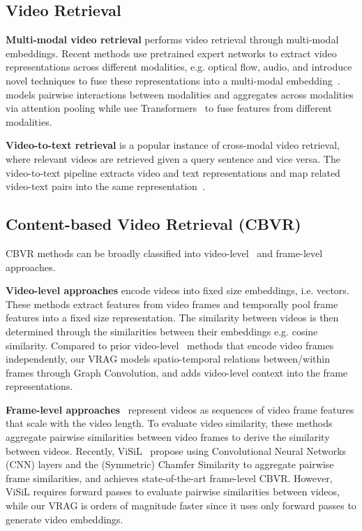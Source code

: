 \documentclass[letterpaper]{article} \usepackage{aaai22}  \usepackage{times}  \usepackage{helvet}  \usepackage{courier}  \usepackage[hyphens]{url}  \usepackage{graphicx} \urlstyle{rm} \usepackage{amsmath}
\begin{document}
\subsection{Video Retrieval}

\textbf{Multi-modal video retrieval} performs video retrieval through multi-modal embeddings. Recent methods use pretrained expert networks to extract video representations across different modalities, e.g. optical flow, audio, and introduce novel techniques to fuse these representations into a multi-modal embedding~\cite{collaborative-experts, moEE, mm-transformer}. \cite{collaborative-experts} models pairwise interactions between modalities and aggregates across modalities via attention pooling while \cite{mm-transformer} use Transformers~\cite{attention-is-all-you-need} to fuse features from different modalities.

\textbf{Video-to-text retrieval} is a popular instance of cross-modal video retrieval, where relevant videos are retrieved given a query sentence and vice versa. The video-to-text pipeline extracts video and text representations and map related video-text pairs into the same representation~\cite{collaborative-experts, howto100m}.

\subsection{Content-based Video Retrieval (CBVR)}
CBVR methods can be broadly classified into video-level~\cite{baseline:tmk, Baraldi2018LAMVLT, kordopatis2017dml, lbow} and frame-level~\cite{temporal_network, baseline:dp, kordopatiszilos2019visil} approaches.

\textbf{Video-level approaches} encode videos into fixed size embeddings, i.e.  vectors. These methods extract features from video frames and temporally pool frame features into a fixed size representation. The similarity between videos is then determined through the similarities between their embeddings e.g. cosine similarity. Compared to prior video-level~\cite{kordopatis2017dml, lbow, baseline:tmk, Baraldi2018LAMVLT} methods that encode video frames independently, our VRAG models spatio-temporal relations between/within frames through Graph Convolution, and adds video-level context into the frame representations.

\textbf{Frame-level approaches}~\cite{temporal_network, baseline:dp} represent videos as sequences of video frame features that scale with the video length. To evaluate video similarity, these methods aggregate pairwise similarities between video frames to derive the similarity between videos. Recently, ViSiL~\cite{kordopatiszilos2019visil} propose using Convolutional Neural Networks (CNN) layers and the (Symmetric) Chamfer Similarity to aggregate pairwise frame similarities, and achieves state-of-the-art frame-level CBVR. However, ViSiL requires  forward passes to evaluate pairwise similarities between  videos, while our VRAG is orders of magnitude faster since it uses only  forward passes to generate video embeddings.
\end{document}
